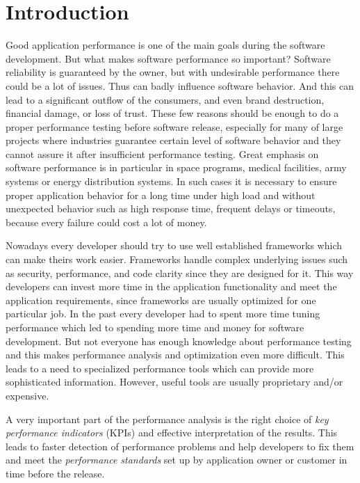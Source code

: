 \chapter{Introduction}
\label{Introduction}
Good application performance is one of the main goals during the software development. But what makes software performance so important? Software reliability is guaranteed by the owner, but with undesirable performance there could be a lot of issues. Thus can badly influence software behavior. And this can lead to a significant outflow of the consumers, and even brand destruction, financial damage, or loss of trust. These few reasons should be enough to do a proper performance testing before software release, especially for many of large projects where industries guarantee certain level of software behavior and they cannot assure it after insufficient performance testing. Great emphasis on software performance is in particular in space programs, medical facilities, army systems or energy distribution systems. In such cases it is necessary to ensure proper application behavior for a long time under high load and without unexpected behavior such as high response time, frequent delays or timeouts, because every failure could cost a lot of money. 

Nowadays every developer should try to use well established frameworks which can make theirs work easier. Frameworks handle complex underlying issues such as security, performance, and code clarity since they are designed for it. This way developers can invest more time in the application functionality and meet the application requirements, since frameworks are usually optimized for one particular job. In the past every developer had to spent more time tuning performance which led to spending more time and money for software development. But not everyone has enough knowledge about performance testing and this makes performance analysis and optimization even more difficult. This leads to a need to specialized performance tools which can provide more sophisticated information. However, useful tools are usually proprietary and/or expensive.

A very important part of the performance analysis is the right choice of \emph{key performance indicators} (KPIs) \cite{Molyneaux:TAoAPT} and effective interpretation of the results. This leads to faster detection of performance problems and help developers to fix them and meet the \emph{performance standards} \cite{Molyneaux:TAoAPT} set up by application owner or customer in time before the release. 

